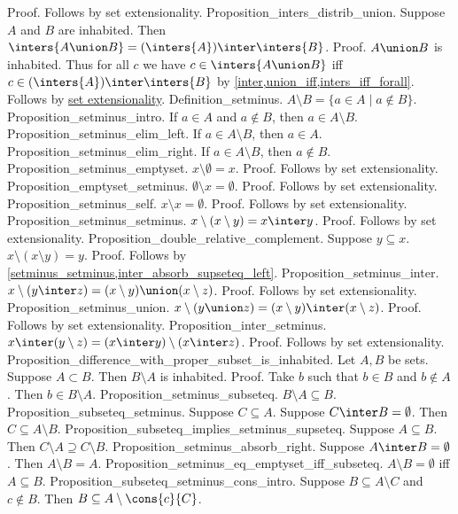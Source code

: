 Proof. Follows by set extensionality.
Proposition_inters_distrib_union. Suppose $A$ and $B$ are inhabited. Then $ \inters{A \union B} = ( \inters{A}) \inter \inters{B}$.
Proof. $A \union B$ is inhabited. Thus for all $c$ we have $c \in \inters{A \union B}$ iff $c \in( \inters{A}) \inter \inters{B}$ by  \cref{inter,union_iff,inters_iff_forall}. Follows by  \hyperref[setext]{set extensionality}. %
Definition_setminus. $A \setminus B =  \{ a  \in A  \mid a \not \in B \}$.
Proposition_setminus_intro. If $a \in A$ and $a \notin B$, then $a \in A \setminus B$.
Proposition_setminus_elim_left. If $a \in A \setminus B$, then $a \in A$.
Proposition_setminus_elim_right. If $a \in A \setminus B$, then $a \notin B$.
Proposition_setminus_emptyset. $x \setminus  \emptyset = x$.
Proof. Follows by set extensionality.
Proposition_emptyset_setminus. $ \emptyset \setminus x =  \emptyset$.
Proof. Follows by set extensionality.
Proposition_setminus_self. $x \setminus x =  \emptyset$.
Proof. Follows by set extensionality.
Proposition_setminus_setminus. $x \setminus (x \setminus y) = x \inter y$.
Proof. Follows by set extensionality.
Proposition_double_relative_complement. Suppose $y \subseteq x$. $x \setminus (x \setminus y) = y$.
Proof. Follows by  \cref{setminus_setminus,inter_absorb_supseteq_left}.
Proposition_setminus_inter. $x \setminus (y \inter z) = (x \setminus y) \union (x \setminus z)$.
Proof. Follows by set extensionality.
Proposition_setminus_union. $x \setminus (y \union z) = (x \setminus y) \inter (x \setminus z)$.
Proof. Follows by set extensionality.
Proposition_inter_setminus. $x \inter (y \setminus z) = (x \inter y) \setminus (x \inter z)$.
Proof. Follows by set extensionality.
Proposition_difference_with_proper_subset_is_inhabited. Let $A, B$ be sets. Suppose $A \subset B$. Then $B \setminus A$ is inhabited.
Proof. Take $b$ such that $b \in B$ and $b \notin A$. Then $b \in B \setminus A$.
Proposition_setminus_subseteq. $B \setminus A \subseteq B$.
Proposition_subseteq_setminus. Suppose $C \subseteq A$. Suppose $C \inter B =  \emptyset$. Then $C \subseteq A \setminus B$.
Proposition_subseteq_implies_setminus_supseteq. Suppose $A \subseteq B$. Then $C \setminus A \supseteq C \setminus B$.
Proposition_setminus_absorb_right. Suppose $A \inter B =  \emptyset$. Then $A \setminus B = A$.
Proposition_setminus_eq_emptyset_iff_subseteq. $A \setminus B =  \emptyset$ iff $A \subseteq B$.
Proposition_subseteq_setminus_cons_intro. Suppose $B \subseteq A \setminus C$ and $c \notin B$. Then $B \subseteq A \setminus \cons{c}{C}$.
